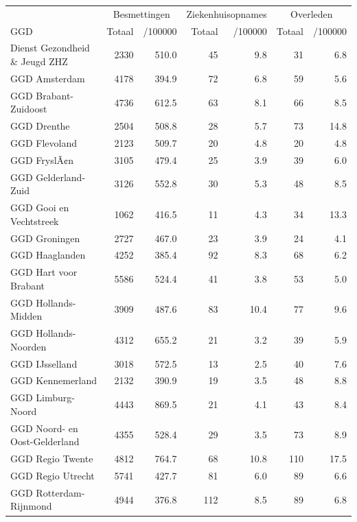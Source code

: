 \documentclass[
  english,
  man,floatsintext]{apa6}
\begin{document}
\begin{table}[H]
\centering\begingroup\fontsize{10}{12}\selectfont

\begin{threeparttable}
\begin{tabular}{lrrrrrr}
\toprule
\multicolumn{1}{c}{ } & \multicolumn{2}{c}{Besmettingen} & \multicolumn{2}{c}{Ziekenhuisopnames} & \multicolumn{2}{c}{Overleden} \\
\cmidrule(l{3pt}r{3pt}){2-3} \cmidrule(l{3pt}r{3pt}){4-5} \cmidrule(l{3pt}r{3pt}){6-7}
GGD & Totaal & /100000 & Totaal & /100000 & Totaal & /100000\\
\midrule
Dienst Gezondheid \& Jeugd ZHZ & 2330 & 510.0 & 45 & 9.8 & 31 & 6.8\\
GGD Amsterdam & 4178 & 394.9 & 72 & 6.8 & 59 & 5.6\\
GGD Brabant-Zuidoost & 4736 & 612.5 & 63 & 8.1 & 66 & 8.5\\
GGD Drenthe & 2504 & 508.8 & 28 & 5.7 & 73 & 14.8\\
GGD Flevoland & 2123 & 509.7 & 20 & 4.8 & 20 & 4.8\\
GGD FryslÃ¢n & 3105 & 479.4 & 25 & 3.9 & 39 & 6.0\\
GGD Gelderland-Zuid & 3126 & 552.8 & 30 & 5.3 & 48 & 8.5\\
GGD Gooi en Vechtstreek & 1062 & 416.5 & 11 & 4.3 & 34 & 13.3\\
GGD Groningen & 2727 & 467.0 & 23 & 3.9 & 24 & 4.1\\
GGD Haaglanden & 4252 & 385.4 & 92 & 8.3 & 68 & 6.2\\
GGD Hart voor Brabant & 5586 & 524.4 & 41 & 3.8 & 53 & 5.0\\
GGD Hollands-Midden & 3909 & 487.6 & 83 & 10.4 & 77 & 9.6\\
GGD Hollands-Noorden & 4312 & 655.2 & 21 & 3.2 & 39 & 5.9\\
GGD IJsselland & 3018 & 572.5 & 13 & 2.5 & 40 & 7.6\\
GGD Kennemerland & 2132 & 390.9 & 19 & 3.5 & 48 & 8.8\\
GGD Limburg-Noord & 4443 & 869.5 & 21 & 4.1 & 43 & 8.4\\
GGD Noord- en Oost-Gelderland & 4355 & 528.4 & 29 & 3.5 & 73 & 8.9\\
GGD Regio Twente & 4812 & 764.7 & 68 & 10.8 & 110 & 17.5\\
GGD Regio Utrecht & 5741 & 427.7 & 81 & 6.0 & 89 & 6.6\\
GGD Rotterdam-Rijnmond & 4944 & 376.8 & 112 & 8.5 & 89 & 6.8\\

\end{tabular}
\end{threeparttable}
\end{table}
\end{document}
